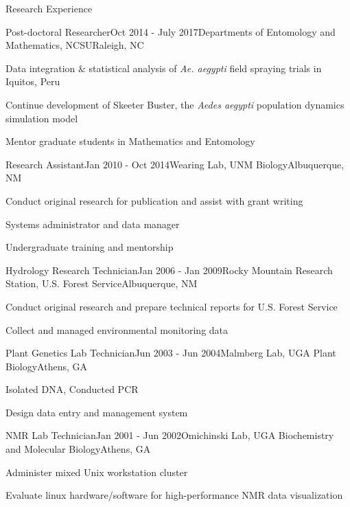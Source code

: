 \documentclass{resume} %
\begin{document}
\begin{rSection}{Research Experience}

\begin{rSubsection}{Post-doctoral Researcher}{Oct 2014 - July 2017}{Departments of
Entomology and Mathematics, NCSU}{Raleigh, NC}
\item Data integration \& statistical analysis of {\em Ae. aegypti} field spraying trials in Iquitos, Peru
\item Continue development of Skeeter Buster, the {\em Aedes aegypti} population dynamics simulation model
\item Mentor graduate students in Mathematics and Entomology
\end{rSubsection}

\begin{rSubsection}{Research Assistant}{Jan 2010 - Oct 2014}{Wearing Lab, UNM Biology}{Albuquerque, NM}
\item Conduct original research for publication and assist with grant writing
\item Systems administrator and data manager
\item Undergraduate training and mentorship
\end{rSubsection}

\begin{rSubsection}{Hydrology Research Technician}{Jan 2006 - Jan 2009}{Rocky
Mountain Research Station, U.S. Forest Service}{Albuquerque, NM}
\item Conduct original research and prepare technical reports for U.S. Forest Service
\item Collect and managed environmental monitoring data 
\end{rSubsection}

\begin{rSubsection}{Plant Genetics Lab Technician}{Jun 2003 - Jun 2004}{Malmberg Lab, UGA Plant Biology}{Athens, GA}
\item Isolated DNA, Conducted PCR
\item Design data entry and management system
\end{rSubsection}

\begin{rSubsection}{NMR Lab Technician}{Jan 2001 - Jun 2002}{Omichinski Lab, UGA
Biochemistry and Molecular Biology}{Athens, GA}
\item Administer mixed Unix workstation cluster
\item Evaluate linux hardware/software for high-performance NMR data visualization
\end{rSubsection}
\end{rSection}
\end{document}
